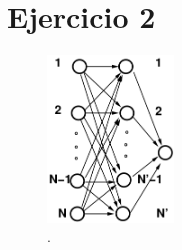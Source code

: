 \section*{Ejercicio 2}
\graphicspath{{Figuras/}}

\begin{figure}[h!]
    \centering
    \includegraphics[width=0.3\textwidth]{Figuras/ejer_2_NN1.png}
    \caption{.}
    \label{02:fig:Arquitectura}
\end{figure}


